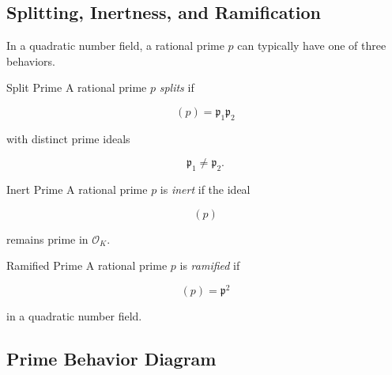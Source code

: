 \subsection{Splitting, Inertness, and Ramification}
\label{subsec:splitting-inert-ramification}

In a quadratic number field, a rational prime \(p\) can typically have one of
three behaviors.

\begin{definitionbox}{Split Prime}
A rational prime \(p\) \emph{splits} if

\[ (p)=\mathfrak p_1\mathfrak p_2 \]

with distinct prime ideals

\[ \mathfrak p_1\neq\mathfrak p_2. \]
\end{definitionbox}

\begin{definitionbox}{Inert Prime}
A rational prime \(p\) is \emph{inert} if the ideal

\[ (p) \]

remains prime in \(\mathcal O_K\).
\end{definitionbox}

\begin{definitionbox}{Ramified Prime}
A rational prime \(p\) is \emph{ramified} if

\[ (p)=\mathfrak p^2 \]

in a quadratic number field.
\end{definitionbox}

\subsection{Prime Behavior Diagram}
\label{subsec:prime-behavior-diagram}

\begin{centereddiagram}
\end{centereddiagram}

